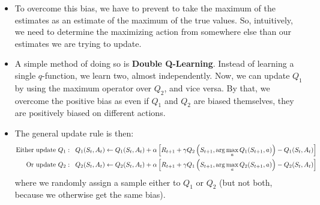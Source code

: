 \begin{itemize}
	\item To overcome this bias, we have to prevent to take the maximum of the estimates as an estimate of the maximum of the true values. So, intuitively, we need to determine the maximizing action from somewhere else than our estimates we are trying to update.
	\item A simple method of doing so is \textbf{Double Q-Learning}. Instead of learning a single $q$-function, we learn two, almost independently. Now, we can update $Q_1$ by using the maximum operator over $Q_2$, and vice versa. By that, we overcome the positive bias as even if $Q_1$ and $Q_2$ are biased themselves, they are positively biased on different actions. 
	\item The general update rule is then:
	\begin{equation*}
		\begin{split}
			\text{Either update }Q_1: \hspace{2mm} Q_1(S_t,A_t) & \leftarrow Q_1(S_t,A_t) + \alpha\left[R_{t+1}+\gamma Q_2\left(S_{t+1},\arg\max_a Q_1(S_{t+1},a)\right)-Q_1(S_t,A_t)\right]\\
			\text{Or update }Q_2: \hspace{2mm} Q_2(S_t,A_t) & \leftarrow Q_2(S_t,A_t) + \alpha\left[R_{t+1}+\gamma Q_1\left(S_{t+1},\arg\max_a Q_2(S_{t+1},a)\right)-Q_2(S_t,A_t)\right]
		\end{split}
	\end{equation*}
	where we randomly assign a sample either to $Q_1$ or $Q_2$ (but not both, because we otherwise get the same bias).
\end{itemize}

